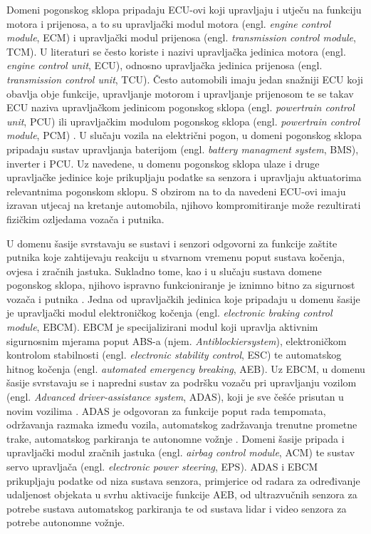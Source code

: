 \documentclass[times, utf8, diplomski, numeric]{fer}
\begin{document}
Domeni pogonskog sklopa pripadaju ECU-ovi koji upravljaju i utječu na funkciju motora i prijenosa, a to su upravljački modul motora (engl. \textit{engine control module}, ECM) i upravljački modul prijenosa (engl. \textit{transmission control module}, TCM). U literaturi se često koriste i nazivi upravljačka jedinica motora (engl. \textit{engine control unit}, ECU), odnosno upravljačka jedinica prijenosa (engl. \textit{transmission control unit}, TCU)\cite{nasser2023automotive, koscher2010}. Često automobili imaju jedan snažniji ECU koji obavlja obje funkcije, upravljanje motorom i upravljanje prijenosom te se takav ECU naziva upravljačkom jedinicom pogonskog sklopa (engl. \textit{powertrain control unit}, PCU) ili upravljačkim modulom pogonskog sklopa (engl. \textit{powertrain control module}, PCM) \cite{bosch2022handbook, ecutesting}. U slučaju vozila na električni pogon, u domeni pogonskog sklopa pripadaju sustav upravljanja baterijom (engl. \textit{battery managment system}, BMS), inverter  i PCU. Uz navedene, u domenu pogonskog sklopa ulaze i druge upravljačke jedinice koje prikupljaju podatke sa senzora i upravljaju aktuatorima relevantnima pogonskom sklopu. S obzirom na to da navedeni ECU-ovi imaju izravan utjecaj na kretanje automobila, njihovo kompromitiranje može rezultirati fizičkim ozljedama vozača i putnika.

U domenu šasije svrstavaju se sustavi i senzori odgovorni za funkcije zaštite putnika koje zahtijevaju reakciju u stvarnom vremenu poput sustava kočenja, ovjesa i zračnih jastuka. Sukladno tome, kao i u slučaju sustava domene pogonskog sklopa, njihovo ispravno funkcioniranje je iznimno bitno za sigurnost vozača i putnika \cite{nasser2023automotive}. Jedna od upravljačkih jedinica koje pripadaju u domenu šasije je upravljački modul elektroničkog kočenja (engl. \textit{electronic braking control module}, EBCM). EBCM je specijalizirani modul koji upravlja aktivnim sigurnosnim mjerama poput ABS-a (njem. \textit{Antiblockiersystem}), elektroničkom kontrolom stabilnosti (engl. \textit{electronic stability control}, ESC) te automatskog hitnog kočenja (engl. \textit{automated emergency breaking}, AEB). Uz EBCM, u domenu šasije svrstavaju se i napredni sustav za podršku vozaču pri upravljanju vozilom (engl. \textit{Advanced driver-assistance system}, ADAS), koji je sve češće prisutan u novim vozilima \cite{nasser2023automotive}. ADAS je odgovoran za funkcije poput rada tempomata, održavanja razmaka između vozila,  automatskog zadržavanja trenutne prometne trake, automatskog parkiranja te autonomne vožnje \cite{bosch2022handbook}. Domeni šasije pripada i upravljački modul zračnih jastuka (engl. \textit{airbag control module}, ACM) te sustav servo upravljača (engl. \textit{electronic power steering}, EPS). ADAS i EBCM prikupljaju podatke od niza sustava senzora, primjerice od radara za određivanje udaljenost objekata u svrhu aktivacije funkcije AEB, od ultrazvučnih senzora za potrebe sustava automatskog parkiranja te od sustava lidar i video senzora za potrebe autonomne vožnje. 
\end{document}
